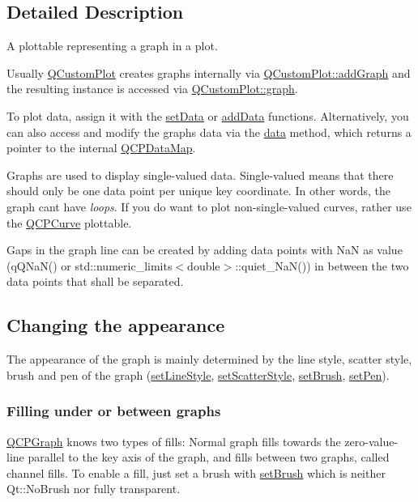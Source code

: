 \subsection{Detailed Description}
A plottable representing a graph in a plot. 



Usually \hyperlink{classQCustomPlot}{Q\+Custom\+Plot} creates graphs internally via \hyperlink{classQCustomPlot_a6fb2873d35a8a8089842d81a70a54167}{Q\+Custom\+Plot\+::add\+Graph} and the resulting instance is accessed via \hyperlink{classQCustomPlot_a6d3ed93c2bf46ab7fa670d66be4cddaf}{Q\+Custom\+Plot\+::graph}.

To plot data, assign it with the \hyperlink{classQCPGraph_a1df2fd710545c8ba3b2c99a39a27bf8b}{set\+Data} or \hyperlink{classQCPGraph_aa5c6181d84db72ce4dbe9dc15a34ef4f}{add\+Data} functions. Alternatively, you can also access and modify the graph\textquotesingle{}s data via the \hyperlink{classQCPGraph_a2f58436df4f86a2792b776a21642b3d9}{data} method, which returns a pointer to the internal \hyperlink{qcustomplot_8h_a84a9c4a4c2216ccfdcb5f3067cda76e3}{Q\+C\+P\+Data\+Map}.

Graphs are used to display single-\/valued data. Single-\/valued means that there should only be one data point per unique key coordinate. In other words, the graph can\textquotesingle{}t have {\itshape loops}. If you do want to plot non-\/single-\/valued curves, rather use the \hyperlink{classQCPCurve}{Q\+C\+P\+Curve} plottable.

Gaps in the graph line can be created by adding data points with NaN as value ({\ttfamily q\+Q\+Na\+N()} or {\ttfamily std\+::numeric\+\_\+limits$<$double$>$\+::quiet\+\_\+\+Na\+N()}) in between the two data points that shall be separated.\hypertarget{classQCPStatisticalBox_appearance}{}\subsection{Changing the appearance}\label{classQCPStatisticalBox_appearance}
The appearance of the graph is mainly determined by the line style, scatter style, brush and pen of the graph (\hyperlink{classQCPGraph_a513fecccff5b2a50ce53f665338c60ff}{set\+Line\+Style}, \hyperlink{classQCPGraph_a12bd17a8ba21983163ec5d8f42a9fea5}{set\+Scatter\+Style}, \hyperlink{classQCPAbstractPlottable_a7a4b92144dca6453a1f0f210e27edc74}{set\+Brush}, \hyperlink{classQCPAbstractPlottable_ab74b09ae4c0e7e13142fe4b5bf46cac7}{set\+Pen}).\hypertarget{classQCPGraph_filling}{}\subsubsection{Filling under or between graphs}\label{classQCPGraph_filling}
\hyperlink{classQCPGraph}{Q\+C\+P\+Graph} knows two types of fills\+: Normal graph fills towards the zero-\/value-\/line parallel to the key axis of the graph, and fills between two graphs, called channel fills. To enable a fill, just set a brush with \hyperlink{classQCPAbstractPlottable_a7a4b92144dca6453a1f0f210e27edc74}{set\+Brush} which is neither Qt\+::\+No\+Brush nor fully transparent.

